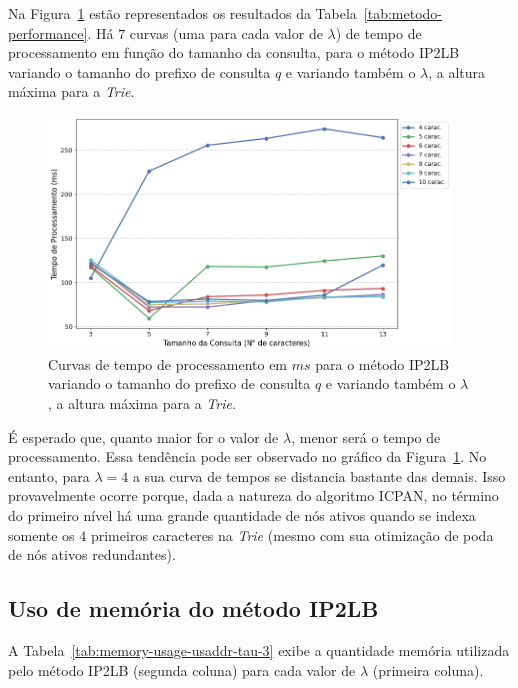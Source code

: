 Na Figura~\ref{fig:varying-usaddr-tau-3} estão representados os resultados da Tabela~\ref{tab:metodo-performance}. Há $7$ curvas (uma para cada valor de $\lambda$) de tempo de processamento em função do tamanho da consulta, para o método IP2LB variando o tamanho do prefixo de consulta $q$ e variando também o $\lambda$, a altura máxima para a \textit{Trie}. 

\begin{figure}[ht!]
    \centering
    \includegraphics[width=0.95\textwidth]{figures/varying_trie_prefix_method_IP2LB_dataset_usaddr_tau_3.png}
    \caption{Curvas de tempo de processamento em $ms$ para o método IP2LB variando o tamanho do prefixo de consulta $q$ e variando também o $\lambda$, a altura máxima para a \textit{Trie}.}
    \label{fig:varying-usaddr-tau-3}
\end{figure}

É esperado que, quanto maior for o valor de $\lambda$, menor será o tempo de processamento. Essa tendência pode ser observado no gráfico da Figura~\ref{fig:varying-usaddr-tau-3}. No entanto, para $\lambda = 4$ a sua curva de tempos se distancia bastante das demais. Isso provavelmente ocorre porque, dada a natureza do algoritmo ICPAN, no término do primeiro nível há uma grande quantidade de nós ativos quando se indexa somente os $4$ primeiros caracteres na \textit{Trie} (mesmo com sua otimização de poda de nós ativos redundantes).

\subsection{Uso de memória do método IP2LB}

A Tabela~\ref{tab:memory-usage-usaddr-tau-3} exibe a quantidade memória utilizada pelo método IP2LB (segunda coluna) para cada valor de $\lambda$ (primeira coluna).

